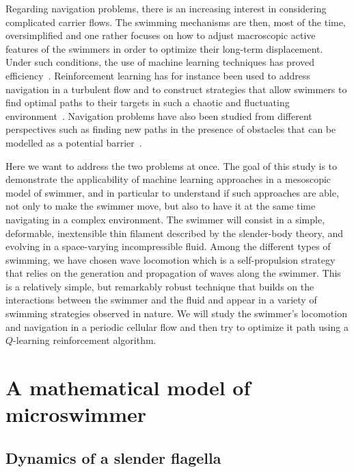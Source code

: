 \documentclass[aps,pre,reprint,superscriptaddress]{revtex4-2}
\begin{document}
Regarding navigation problems, there is an increasing interest in considering complicated carrier flows. The swimming mechanisms are then, most of the time, oversimplified and one rather focuses on how to adjust macroscopic active features of the swimmers in order to optimize their long-term displacement. Under such conditions, the use of machine learning techniques has proved efficiency~\cite{cichos2020machine}. Reinforcement learning has for instance been used to address navigation in a turbulent flow and to construct strategies that allow swimmers to find optimal paths to their targets in such a chaotic and fluctuating environment~\cite{reddy2016learning,colabrese2017flow,alageshan2020machine}. Navigation problems have also been studied from different perspectives such as finding new paths in the presence of obstacles that can be modelled as a potential barrier~\cite{schneider2019optimal}. 

Here we want to address the two problems at once.  The goal of this study is to demonstrate the applicability of machine learning approaches in a mesoscopic model of swimmer, and in particular to understand if such approaches are able, not only to make the swimmer move, but also to have it at the same time navigating in a complex environment. The swimmer will consist in a simple, deformable, inextensible thin filament described by the slender-body theory, and evolving in a space-varying incompressible fluid. Among the different types of swimming, we have chosen wave locomotion which is a self-propulsion strategy that relies on the generation and propagation of waves along the swimmer. This is a relatively simple, but remarkably robust technique that builds on the interactions between the swimmer and the fluid and appear in a variety of swimming strategies observed in nature. We will study the swimmer's locomotion and navigation in a periodic cellular flow and then try to optimize it path using a $Q$-learning reinforcement algorithm.



\section{A mathematical model of microswimmer}

\subsection{Dynamics of a slender flagella}
\end{document}
